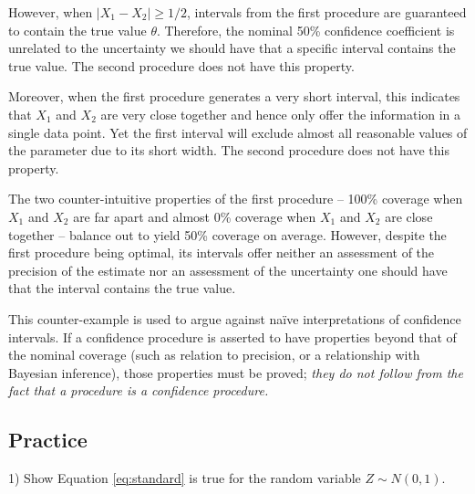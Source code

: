 However, when \(|X_1 - X_2| \geq 1/2\),
intervals from the first procedure are guaranteed to contain the true value \(\theta\).
Therefore, the nominal 50\% confidence coefficient is unrelated to the uncertainty we should have 
that a specific interval contains the true value. 
The second procedure does not have this property.

Moreover, when the first procedure generates a very short interval, 
this indicates that \(X_{1}\) and \(X_{2}\) are very close together and 
hence only offer the information in a single data point. 
Yet the first interval will exclude almost all reasonable values of the parameter due to its short width. 
The second procedure does not have this property.

The two counter-intuitive properties of the first procedure 
-- 100\% coverage when \(X_{1}\) and \(X_{2}\) are far apart 
and almost 0\% coverage when \(X_{1}\) and \(X_{2}\) are close together 
-- balance out to yield 50\% coverage on average. 
However,
despite the first procedure being optimal, 
its intervals offer neither an assessment of the precision of the estimate 
nor an assessment of the uncertainty one should have that the interval contains the true value.

This counter-example is used to argue against naïve interpretations of confidence intervals. 
If a confidence procedure is asserted to have properties beyond that of the nominal coverage (such as relation to precision, 
or a relationship with Bayesian inference), 
those properties must be proved; 
\emph{they do not follow from the fact that a procedure is a confidence procedure.}

\clearpage
\subsection{Practice}

1) Show Equation \ref{eq:standard} is true for the random variable \(Z \sim N(0,1)\).



